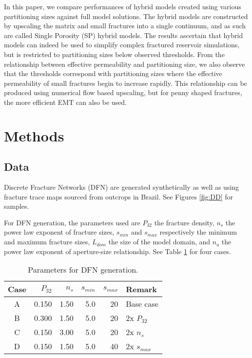 \documentclass[a4paper]{article}
\begin{document}
In this paper, we compare performances of hybrid models created using various partitioning sizes against full model solutions. The hybrid models are constructed by upscaling the matrix and small fractures into a single continuum, and as such are called Single Porosity (SP) hybrid models. The results ascertain that hybrid models can indeed be used to simplify complex fractured reservoir simulations, but is restricted to partitioning sizes below observed thresholds. From the relationship between effective permeability and partitioning size, we also observe that the thresholds correspond with partitioning sizes where the effective permeability of small fractures begin to increase rapidly. This relationship can be produced using numerical flow based upscaling, but for penny shaped fractures, the more efficient EMT can also be used.



\section{Methods}
\subsection{Data}
Discrete Fracture Networks (DFN) are generated synthetically as well as using fracture trace maps sourced from outcrops in Brazil. See Figures \ref{fig:DD} for samples.

For DFN generation, the parameters used are $P_{32}$ the fracture density, $n_s$ the power law exponent of fracture sizes, $s_{min}$ and $s_{max}$ respectively the minimum and maximum fracture sizes, $L_{dom}$ the size of the model domain, and $n_a$ the power law exponent of aperture-size relationship. See Table \ref{table:DFNparams} for four cases.

\begin{table}[h]
	\centering
	\caption{Parameters for DFN generation.}
	
	\begin{tabular}{c r r r r l}
		Case & $P_{32}$ & $n_s$ & $s_{min}$ & $s_{max}$ & Remark \\
		\hline
		A & 0.150 & 1.50 & 5.0 & 20 & Base case\\
		B & 0.300 & 1.50 & 5.0 & 20 & 2x $P_{32}$\\
		C & 0.150 & 3.00 & 5.0 & 20 & 2x $n_s$\\
		D & 0.150 & 1.50 & 5.0 & 40 & 2x $s_{max}$\\
		
	\end{tabular}
	\label{table:DFNparams}
\end{table}
\end{document}
